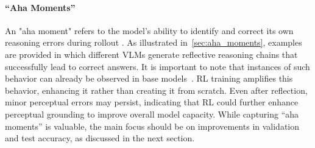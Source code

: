 \documentclass{article} %
\begin{document}
\paragraph{``Aha Moments''}
\label{sec:valid_test_results}
An "aha moment" refers to the model’s ability to identify and correct its own reasoning errors during rollout \citep{guo2025deepseekR1}. 
%
As illustrated in~\cref{sec:aha_moments}, examples are provided in which different VLMs generate reflective reasoning chains that successfully lead to correct answers.
%
It is important to note that instances of such behavior can already be observed in base models~\citep{DrGRPO}. RL training amplifies this behavior, enhancing it rather than creating it from scratch.
%
Even after reflection, minor perceptual errors may persist, indicating that RL could further enhance perceptual grounding to improve overall model capacity.
%
While capturing “aha moments” is valuable, the main focus should be on improvements in validation and test accuracy, as discussed in the next section.
%
\end{document}
